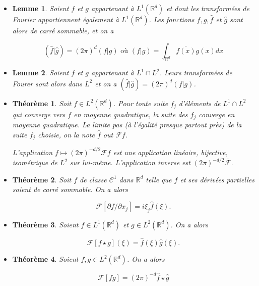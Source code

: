 \documentclass[10pt,a4paper,oneside]{article}
\newtheorem{theoreme}{Théorème}
\newtheorem{lemme}{Lemme}
\begin{document}
\begin{itemize}
\item
\begin{lemme}
Soient $f$ et $g$ appartenant à $L^1(\mathbb{R}^d)$ et dont les transformées de Fourier appartiennent également à $L^1(\mathbb{R}^d)$. Les fonctions $f, g, \hat{f}$ et $\hat{g}$ sont alors de carré sommable, et on a

\[ (\hat{f} | \hat{g}) = (2\pi)^d (f | g) \text{ où } (f | g) = \int_{\mathbb{R}^d} \overline{f(x)} g(x) dx \]
\end{lemme}

\item
\begin{lemme}
Soient $f$ et $g$ appartenant à $L^1 \cap L^2$. Leurs transformées de Fourer sont alors dans $L^2$ et on a $(\hat{f} | \hat{g}) = (2\pi)^d (f | g)$.
\end{lemme}

\item
\begin{theoreme}
Soit $f \in L^2(\mathbb{R}^d)$. Pour toute suite $f_j$ d'éléments de $L^1 \cap L^2$ qui converge vers $f$ en moyenne quadratique, la suite des $\hat{f}_j$ converge en moyenne quadratique. La limite pas (à l'égalité presque partout près) de la suite $f_j$ choisie, on la note $\hat{f}$ out $\mathcal{F} f$.

L'application $f \mapsto (2\pi)^{-d/2} \mathcal{F}f$ est une application linéaire, bijective, isométrique de $L^2$ sur lui-même. L'application inverse est $(2\pi)^{-d/2} \overline{\mathcal{F}}$.
\end{theoreme}

\item
\begin{theoreme}
Soit $f$ de classe $\mathcal{C}^1$ dans $\mathbb{R}^d$ telle que $f$ et ses dérivées partielles soient de carré sommable. On a alors

\[ \mathcal{F}[\partial f / \partial x_j] = i \xi_j \hat{f}(\xi). \]
\end{theoreme}

\item
\begin{theoreme}
Soient $f \in L^1(\mathbb{R}^d)$ et $g \in L^2(\mathbb{R}^d)$. On a alors

\[ \mathcal{F}[f \star g](\xi) = \hat{f}(\xi) \hat{g}(\xi). \]
\end{theoreme}

\item
\begin{theoreme}
Soient $f, g \in L^2(\mathbb{R}^d)$. On a alors

\[ \mathcal{F}[fg] = (2\pi)^{-d} \hat{f} \star \hat{g} \]
\end{theoreme}
\end{itemize}
\end{document}
